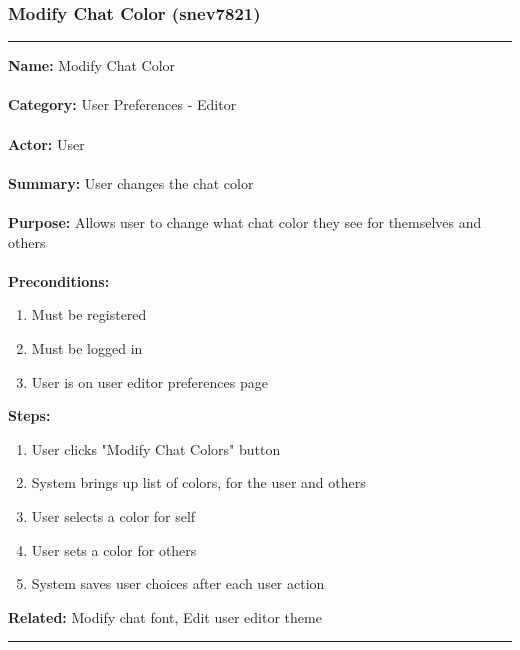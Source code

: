 \documentclass[11pt]{report}
\begin{document}
\subsubsection{Modify Chat Color (snev7821)}
\vspace{2pt}
\hrule
\vspace{8pt}
	\noindent\textbf{Name:} Modify Chat Color \\ \\
	\textbf{Category:} User Preferences - Editor  \\ \\
	\textbf{Actor:} User \\ \\
	\textbf{Summary:} User changes the chat color \\ \\
	\textbf{Purpose:} Allows user to change what chat color they see for themselves and others \\ \\
	\textbf{Preconditions:} 
	\begin{enumerate}
		\item Must be registered
		\item Must be logged in
		\item User is on user editor preferences page
	\end{enumerate}
	\textbf{Steps:}
	\begin{enumerate}
		\item User clicks "Modify Chat Colors" button
		\item System brings up list of colors, for the user and others
		\item User selects a color for self
		\item User sets a color for others
		\item System saves user choices after each user action
	\end{enumerate}
	\textbf{Related:} Modify chat font, Edit user editor theme
\vspace{8pt}
\hrule

\newpage
\end{document}
